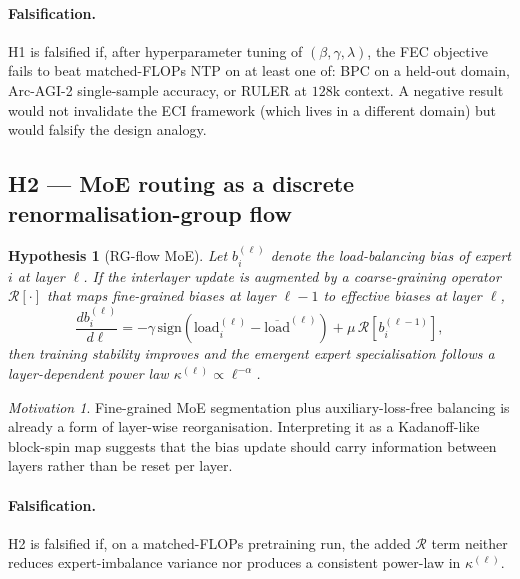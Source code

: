 \documentclass[10pt,a4paper]{article}
\newtheorem{hypothesis}{Hypothesis}
\theoremstyle{remark}
\newtheorem{motivation}{Motivation}
\begin{document}
\paragraph{Falsification.}
H1 is falsified if, after hyperparameter tuning of $(\beta, \gamma,
\lambda)$, the FEC objective fails to beat matched-FLOPs NTP on
at least one of: BPC on a held-out domain, Arc-AGI-2 single-sample
accuracy, or RULER at $128$k context. A negative result would not
invalidate the ECI framework (which lives in a different domain) but
would falsify the design analogy.

\subsection{H2 --- MoE routing as a discrete renormalisation-group
flow}

\begin{hypothesis}[RG-flow MoE]
\label{hyp:rg}
Let $b_i^{(\ell)}$ denote the load-balancing bias of expert $i$ at
layer $\ell$. If the interlayer update is augmented by a
coarse-graining operator $\mathcal{R}[\cdot]$ that maps
fine-grained biases at layer $\ell-1$ to effective biases at layer
$\ell$,
\begin{equation}
 \frac{d b_i^{(\ell)}}{d\ell} = -\gamma\,
  \mathrm{sign}\!\left( \mathrm{load}_i^{(\ell)} -
  \overline{\mathrm{load}}^{(\ell)} \right)
 + \mu\, \mathcal{R}\!\left[ b_i^{(\ell-1)} \right],
 \label{eq:RG}
\end{equation}
then training stability improves and the emergent expert
specialisation follows a layer-dependent power law $\kappa^{(\ell)}
\propto \ell^{-\alpha}$.
\end{hypothesis}

\begin{motivation}
Fine-grained MoE segmentation plus auxiliary-loss-free balancing is
already a form of layer-wise reorganisation. Interpreting it as a
Kadanoff-like block-spin map suggests that the bias update should
carry information between layers rather than be reset per layer.
\end{motivation}

\paragraph{Falsification.}
H2 is falsified if, on a matched-FLOPs pretraining run, the added
$\mathcal{R}$ term neither reduces expert-imbalance variance nor
produces a consistent power-law in $\kappa^{(\ell)}$.
\end{document}
